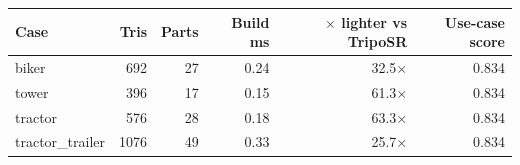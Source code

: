 \begin{tabular}{@{}lrrrrr@{}}
\toprule
Case & Tris & Parts & Build ms & $\times$ lighter vs TripoSR & Use-case score \\
\midrule
biker & 692 & 27 & 0.24 & 32.5$\times$ & 0.834 \\
tower & 396 & 17 & 0.15 & 61.3$\times$ & 0.834 \\
tractor & 576 & 28 & 0.18 & 63.3$\times$ & 0.834 \\
tractor\_trailer & 1076 & 49 & 0.33 & 25.7$\times$ & 0.834 \\
\bottomrule
\end{tabular}
